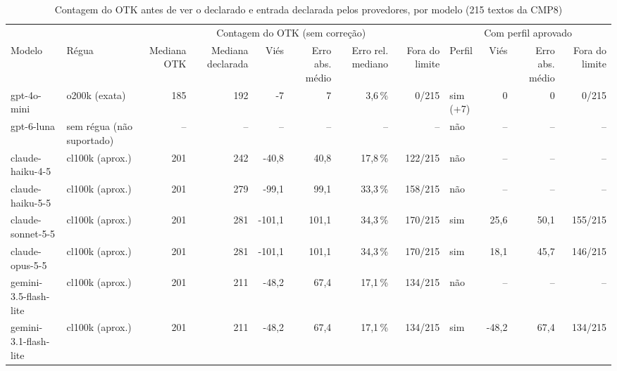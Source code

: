 \begin{table}[htbp]
\centering
\caption{Contagem do OTK antes de ver o declarado e entrada declarada pelos provedores, por modelo (215 textos da CMP8)}
\label{tab:cmp8-estimado-declarado}
\scriptsize
\begin{tabular}{@{}llrrrrrrlrrr@{}}
\toprule
 & & \multicolumn{6}{c}{Contagem do OTK (sem correção)} & \multicolumn{4}{c}{Com perfil aprovado} \\
\cmidrule(lr){3-8}\cmidrule(l){9-12}
Modelo & Régua & Mediana OTK & Mediana declarada & Viés & Erro abs. médio & Erro rel. mediano & Fora do limite & Perfil & Viés & Erro abs. médio & Fora do limite \\
\midrule
gpt-4o-mini & o200k (exata) & 185 & 192 & -7 & 7 & 3{,}6\,\% & 0/215 & sim (+7) & 0 & 0 & 0/215 \\
gpt-6-luna & sem régua (não suportado) & -- & -- & -- & -- & -- & -- & não & -- & -- & -- \\
claude-haiku-4-5 & cl100k (aprox.) & 201 & 242 & -40{,}8 & 40{,}8 & 17{,}8\,\% & 122/215 & não & -- & -- & -- \\
claude-haiku-5-5 & cl100k (aprox.) & 201 & 279 & -99{,}1 & 99{,}1 & 33{,}3\,\% & 158/215 & não & -- & -- & -- \\
claude-sonnet-5-5 & cl100k (aprox.) & 201 & 281 & -101{,}1 & 101{,}1 & 34{,}3\,\% & 170/215 & sim & 25{,}6 & 50{,}1 & 155/215 \\
claude-opus-5-5 & cl100k (aprox.) & 201 & 281 & -101{,}1 & 101{,}1 & 34{,}3\,\% & 170/215 & sim & 18{,}1 & 45{,}7 & 146/215 \\
gemini-3.5-flash-lite & cl100k (aprox.) & 201 & 211 & -48{,}2 & 67{,}4 & 17{,}1\,\% & 134/215 & não & -- & -- & -- \\
gemini-3.1-flash-lite & cl100k (aprox.) & 201 & 211 & -48{,}2 & 67{,}4 & 17{,}1\,\% & 134/215 & sim & -48{,}2 & 67{,}4 & 134/215 \\
\bottomrule
\end{tabular}
\end{table}
